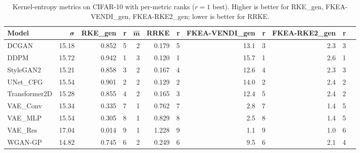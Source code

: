 \begin{table}[H]
\centering
\small
\caption{Kernel-entropy metrics on CIFAR-10 with per-metric ranks ($r{=}1$ best). Higher is better for RKE\_gen, FKEA-VENDI\_gen, FKEA-RKE2\_gen; lower is better for RRKE.}
\label{tab:ke-cifar10-ranked}
\begin{tabular}{lrrrrrrrrrrr}
\toprule
\textbf{Model} & $\boldsymbol{\sigma}$ & \textbf{RKE\_gen} & \textbf{r} & $\boldsymbol{\hat m}$ & \textbf{RRKE} & \textbf{r} & \textbf{FKEA-VENDI\_gen} & \textbf{r} & \textbf{FKEA-RKE2\_gen} & \textbf{r} \\
\midrule
DCGAN         & 15.18 & 0.852 & 5 & 2 & 0.179 & 5 & 13.1 & 3 & 2.3 & 3 \\
DDPM          & 15.72 & 0.942 & 1 & 3 & 0.120 & 1 & 15.7 & 1 & 2.6 & 1 \\
StyleGAN2     & 15.21 & 0.858 & 3 & 2 & 0.167 & 4 & 12.6 & 4 & 2.3 & 3 \\
UNet\_CFG     & 15.54 & 0.901 & 2 & 2 & 0.129 & 2 & 14.0 & 2 & 2.4 & 2 \\
Transformer2D & 15.28 & 0.855 & 4 & 2 & 0.165 & 3 & 12.4 & 5 & 2.4 & 2 \\
VAE\_Conv     & 15.34 & 0.335 & 7 & 1 & 0.762 & 7 &  2.8 & 7 & 1.4 & 5 \\
VAE\_MLP      & 15.54 & 0.305 & 8 & 1 & 0.829 & 8 &  2.5 & 8 & 1.4 & 5 \\
VAE\_Res      & 17.04 & 0.014 & 9 & 1 & 1.228 & 9 &  1.1 & 9 & 1.0 & 6 \\
WGAN-GP        & 14.82 & 0.745 & 6 & 2 & 0.249 & 6 &  9.5 & 6 & 2.1 & 4 \\
\bottomrule
\end{tabular}
\end{table}

